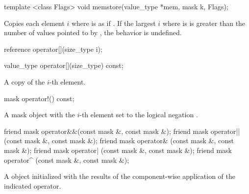 \begin{itemdecl}
template <class Flags> void memstore(value_type *mem, mask k, Flags);
\end{itemdecl}
\begin{itemdescr}
  \pnum\effects Copies each \mask element $i$ where  is \true as if  \foralli.
  \pnum\remarks If the largest $i$ where  is \true is greater than the number of values pointed to by , the behavior is undefined.
  \flagsRemarks{\mask{}}
\end{itemdescr}

\begin{itemdecl}
reference operator[](size_type i);
\end{itemdecl}
\begin{itemdescr}
  \dataparElementReference
\end{itemdescr}

\begin{itemdecl}
value_type operator[](size_type) const;
\end{itemdecl}
\begin{itemdescr}
  \pnum\returns A copy of the $i$-th element.
\end{itemdescr}

\begin{itemdecl}
mask operator!() const;
\end{itemdecl}
\begin{itemdescr}
  \pnum\returns A mask object with the $i$-th element set to the logical negation \foralli.
\end{itemdescr}


\begin{itemdecl}
friend mask operator&&(const mask &, const mask &);
friend mask operator||(const mask &, const mask &);
friend mask operator& (const mask &, const mask &);
friend mask operator| (const mask &, const mask &);
friend mask operator^ (const mask &, const mask &);
\end{itemdecl}
\begin{itemdescr}
  \pnum\returns A \mask object initialized with the results of the component-wise application of the indicated operator.
\end{itemdescr}

